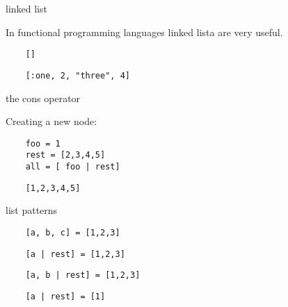 \begin{frame}[fragile]{linked list}

  In functional programming languages linked lista are very useful.\pause

  \vspace{20pt}
  \begin{lstlisting}
    []
  \end{lstlisting}
  \vspace{10pt}\pause
  \begin{lstlisting}
    [:one, 2, "three", 4]
  \end{lstlisting}  
  
\end{frame}

\begin{frame}[fragile]{the cons operator}

  Creating a new node:\pause

  \vspace{20pt}
  \begin{lstlisting}
    foo = 1
    rest = [2,3,4,5]
    all = [ foo | rest] 
  \end{lstlisting}
  \vspace{10pt}\pause
  \begin{lstlisting}
    [1,2,3,4,5]
  \end{lstlisting}  
  
\end{frame}

\begin{frame}[fragile]{list patterns}

  \vspace{20pt}
  \begin{lstlisting}
    [a, b, c] = [1,2,3]
  \end{lstlisting}
  \vspace{10pt}\pause
  \begin{lstlisting}
    [a | rest] = [1,2,3]
  \end{lstlisting}  

  \vspace{10pt}\pause
  \begin{lstlisting}
    [a, b | rest] = [1,2,3]
  \end{lstlisting}    

  \vspace{10pt}\pause
  \begin{lstlisting}
    [a | rest] = [1]
  \end{lstlisting}    
\end{frame}


